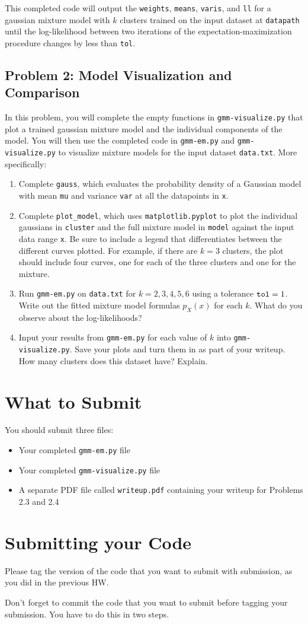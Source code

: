 \documentclass[10pt]{article}
\begin{document}
This completed code will output the {\tt weights}, {\tt means}, {\tt varis}, and {\tt ll} for a gaussian mixture model with $k$ clusters trained on the input dataset at {\tt datapath} until the log-likelihood between two iterations of the expectation-maximization procedure changes by less than {\tt tol}.

\subsection{Problem 2: Model Visualization and Comparison}
In this problem, you will complete the empty functions in {\tt gmm-visualize.py} that plot a trained gaussian mixture model and the individual components of the model. You will then use the completed code in {\tt gmm-em.py} and {\tt gmm-visualize.py} to visualize mixture models for the input dataset {\tt data.txt}. More specifically:
\begin{enumerate}
\item Complete {\tt gauss}, which evaluates the probability density of a Gaussian model with mean {\tt mu} and variance {\tt var} at all the datapoints in {\tt x}.

\item Complete {\tt plot\_model}, which uses {\tt matplotlib.pyplot} to plot the individual gaussians in {\tt cluster} and the full mixture model in {\tt model} against the input data range {\tt x}. Be sure to include a legend that differentiates between the different curves plotted. For example, if there are $k = 3$ clusters, the plot should include four curves, one for each of the three clusters and one for the mixture.

\item Run {\tt gmm-em.py} on {\tt data.txt} for $k = 2, 3, 4, 5, 6$ using a tolerance ${\tt tol} = 1$. Write out the fitted mixture model formulas $p_X(x)$ for each $k$. What do you observe about the log-likelihoods?

\item Input your results from {\tt gmm-em.py} for each value of $k$ into {\tt gmm-visualize.py}. Save your plots and turn them in as part of your writeup. How many clusters does this dataset have? Explain.
\end{enumerate}

\section{What to Submit}
You should submit three files:
\begin{itemize}
\item Your completed {\tt gmm-em.py} file
\item Your completed {\tt gmm-visualize.py} file
\item A separate PDF file called {\tt writeup.pdf} containing your writeup for Problems 2.3 and 2.4
\end{itemize}


\section{Submitting your Code}
Please tag the version of the code that you want to submit with submission, as you did in the previous HW.

Don't forget to commit the code that you want to submit before tagging your submission. You have to do this in two steps.
\end{document}

